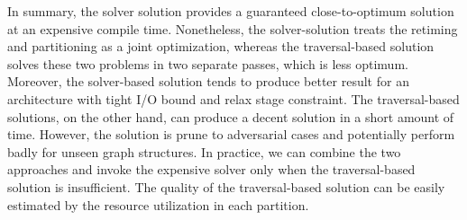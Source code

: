 In summary, the solver solution provides a guaranteed close-to-optimum solution at an expensive
compile time. Nonetheless, the solver-solution treats the retiming and partitioning as a joint optimization,
whereas the traversal-based solution solves these two problems in two separate passes,
which is less optimum.
Moreover, the solver-based solution tends to produce better result for an architecture with tight I/O
bound and relax stage constraint.
The traversal-based solutions, on the other hand, can produce a decent solution in a short amount of
time.
However, the solution is prune to adversarial cases and potentially perform badly for unseen graph
structures.
In practice, we can combine the two approaches and invoke the expensive solver only when the
traversal-based solution is insufficient. The quality of the traversal-based solution can be 
easily estimated by the resource utilization in each partition.

